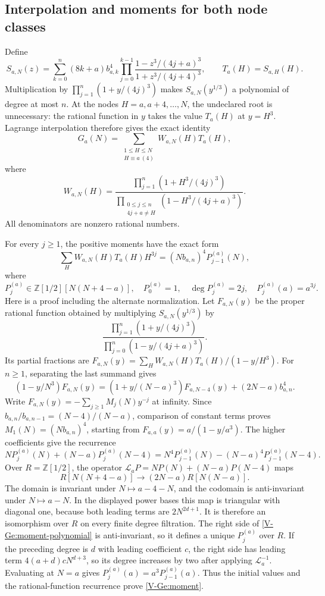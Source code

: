 \documentclass[11pt,letterpaper]{article}
\numberwithin{equation}{section}
\begin{document}
\subsection{Interpolation and moments for both node classes}
Define
\[
 S_{a,N}(z)=\sum_{k=0}^{n}(8k+a)b_{a,k}^4
 \prod_{j=0}^{k-1}
 \frac{1-z^3/(4j+a)^3}{1+z^3/(4j+4)^3},\qquad
 T_a(H)=S_{a,H}(H).
\]
Multiplication by $\prod_{j=1}^{n}(1+y/(4j)^3)$ makes
$S_{a,N}(y^{1/3})$ a polynomial of degree at most $n$.
At the nodes $H=a,a+4,\ldots,N$, the undeclared root is unnecessary:
the rational function in $y$ takes the value $T_a(H)$ at $y=H^3$.
Lagrange interpolation therefore gives the exact identity
\begin{equation}\label{V-Ge:interpolation}
G_a(N)=\sum_{\substack{1\le H\le N\\H\equiv a\ (4)}}
W_{a,N}(H)T_a(H),
\end{equation}
where
\[
W_{a,N}(H)=
\frac{\prod_{j=1}^{n}(1+H^3/(4j)^3)}
{\prod_{\substack{0\le j\le n\\4j+a\ne H}}
 (1-H^3/(4j+a)^3)}.
\]
All denominators are nonzero rational numbers.

For every $j\ge1$, the positive moments have the exact form
\begin{equation}\label{V-Ge:moment}
\sum_H W_{a,N}(H)T_a(H)H^{3j}
=(Nb_{a,n})^4P^{(a)}_{j-1}(N),
\end{equation}
where
\[
 P^{(a)}_j\in\mathbb Z[1/2][N(N+4-a)],\quad
 P^{(a)}_0=1,\quad \deg P^{(a)}_j=2j,
 \quad P^{(a)}_j(a)=a^{3j}.
\]
Here is a proof including the alternate normalization.
Let $F_{a,N}(y)$ be the proper rational function obtained by
multiplying $S_{a,N}(y^{1/3})$ by
\[
\frac{\prod_{j=1}^{n}(1+y/(4j)^3)}
 {\prod_{j=0}^{n}(1-y/(4j+a)^3)}.
\]
Its partial fractions are
$F_{a,N}(y)=\sum_H W_{a,N}(H)T_a(H)/(1-y/H^3)$.
For $n\ge1$, separating the last summand gives
\[
(1-y/N^3)F_{a,N}(y)
=(1+y/(N-a)^3)F_{a,N-4}(y)+(2N-a)b_{a,n}^4.
\]
Write $F_{a,N}(y)=-\sum_{j\ge1}M_j(N)y^{-j}$ at infinity.
Since $b_{a,n}/b_{a,n-1}=(N-4)/(N-a)$, comparison of constant
terms proves $M_1(N)=(Nb_{a,n})^4$, starting from
$F_{a,a}(y)=a/(1-y/a^3)$.
The higher coefficients give the recurrence
\begin{equation}\label{V-Ge:moment-polynomial}
 NP^{(a)}_j(N)+(N-a)P^{(a)}_j(N-4)
 =N^4P^{(a)}_{j-1}(N)-(N-a)^4P^{(a)}_{j-1}(N-4).
\end{equation}
Over $R=\mathbb Z[1/2]$, the operator
$\mathcal L_aP=NP(N)+(N-a)P(N-4)$ maps
\[
R[N(N+4-a)]\longrightarrow(2N-a)R[N(N-a)].
\]
The domain is invariant under $N\mapsto a-4-N$, and the codomain
is anti-invariant under $N\mapsto a-N$. In the displayed power bases
this map is triangular with diagonal one, because both leading
terms are $2N^{2d+1}$. It is therefore an isomorphism over $R$ on
every finite degree filtration. The right side of
\eqref{V-Ge:moment-polynomial} is anti-invariant, so it defines a
unique $P^{(a)}_j$ over $R$. If the preceding degree is $d$ with
leading coefficient $c$, the right side has leading term
$4(a+d)cN^{d+3}$, so its degree increases by two after applying
$\mathcal L_a^{-1}$. Evaluating at $N=a$ gives
$P^{(a)}_j(a)=a^3P^{(a)}_{j-1}(a)$.
Thus the initial values and the rational-function recurrence prove
\eqref{V-Ge:moment}.
\end{document}
